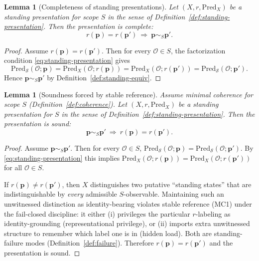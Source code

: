 \documentclass[11pt]{article}
\newtheorem{lemma}[definition]{Lemma}
\theoremstyle{remark}
\newcommand{\Skin}{\mathcal{S}}
\begin{document}
\begin{lemma}[Completeness of standing presentations]\label{lem:standing-complete}
Let $(X,r,\mathrm{Pred}_X)$ be a standing presentation for scope $S$ in the sense of
Definition~\ref{def:standing-presentation}.
Then the presentation is \emph{complete}:
\[
r(\mathbf{p})=r(\mathbf{p}')\ \Longrightarrow\ \mathbf{p}\sim_S \mathbf{p}'.
\]
\end{lemma}

\begin{proof}
Assume $r(\mathbf{p})=r(\mathbf{p}')$.
Then for every $\mathcal{O}\in S$, the factorization condition \eqref{eq:standing-presentation} gives
\[
\mathrm{Pred}_{\Skin}(\mathcal{O};\mathbf{p})
=\mathrm{Pred}_X(\mathcal{O};r(\mathbf{p}))
=\mathrm{Pred}_X(\mathcal{O};r(\mathbf{p}'))
=\mathrm{Pred}_{\Skin}(\mathcal{O};\mathbf{p}').
\]
Hence $\mathbf{p}\sim_S\mathbf{p}'$ by Definition~\ref{def:standing-equiv}.
\end{proof}

\begin{lemma}[Soundness forced by stable reference]\label{lem:standing-sound}
Assume minimal coherence for scope $S$ (Definition~\ref{def:coherence}).
Let $(X,r,\mathrm{Pred}_X)$ be a standing presentation for $S$ in the sense of
Definition~\ref{def:standing-presentation}.
Then the presentation is \emph{sound}:
\[
\mathbf{p}\sim_S\mathbf{p}'\ \Longrightarrow\ r(\mathbf{p})=r(\mathbf{p}').
\]
\end{lemma}

\begin{proof}
Assume $\mathbf{p}\sim_S\mathbf{p}'$.
Then for every $\mathcal{O}\in S$,
$\mathrm{Pred}_{\Skin}(\mathcal{O};\mathbf{p})=\mathrm{Pred}_{\Skin}(\mathcal{O};\mathbf{p}')$.
By \eqref{eq:standing-presentation} this implies
$\mathrm{Pred}_X(\mathcal{O};r(\mathbf{p}))=\mathrm{Pred}_X(\mathcal{O};r(\mathbf{p}'))$ for all $\mathcal{O}\in S$.

If $r(\mathbf{p})\neq r(\mathbf{p}')$, then $X$ distinguishes two putative ``standing states'' that are
indistinguishable by \emph{every} admissible $S$-observable. Maintaining such an unwitnessed distinction as
identity-bearing violates stable reference (MC1) under the fail-closed discipline: it either (i) privileges the
particular $r$-labeling as identity-grounding (representational privilege), or (ii) imports extra unwitnessed
structure to remember which label one is in (hidden load). Both are standing-failure modes
(Definition~\ref{def:failure}). Therefore $r(\mathbf{p})=r(\mathbf{p}')$ and the presentation is sound.
\end{proof}
\end{document}

